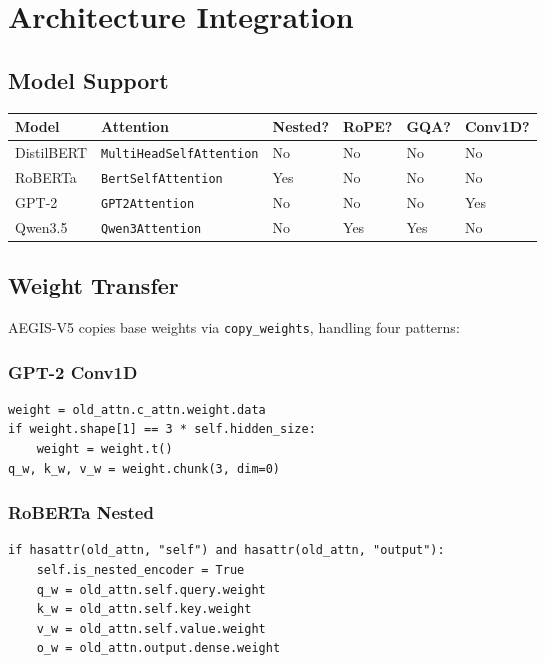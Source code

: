 \section{Architecture Integration}

\subsection{Model Support}

\begin{table}[H]
\centering
\small
\begin{tabular}{llllll}
\toprule
\textbf{Model} & \textbf{Attention} & \textbf{Nested?} & \textbf{RoPE?} & \textbf{GQA?} & \textbf{Conv1D?} \\
\midrule
DistilBERT & \texttt{MultiHeadSelfAttention} & No & No & No & No \\
RoBERTa & \texttt{BertSelfAttention} & Yes & No & No & No \\
GPT-2 & \texttt{GPT2Attention} & No & No & No & Yes \\
Qwen3.5 & \texttt{Qwen3Attention} & No & Yes & Yes & No \\
\bottomrule
\end{tabular}
\end{table}

\subsection{Weight Transfer}

AEGIS-V5 copies base weights via \texttt{copy\_weights}, handling four patterns:

\subsubsection{GPT-2 Conv1D}

\begin{lstlisting}
weight = old_attn.c_attn.weight.data
if weight.shape[1] == 3 * self.hidden_size:
    weight = weight.t()
q_w, k_w, v_w = weight.chunk(3, dim=0)
\end{lstlisting}

\subsubsection{RoBERTa Nested}

\begin{lstlisting}
if hasattr(old_attn, "self") and hasattr(old_attn, "output"):
    self.is_nested_encoder = True
    q_w = old_attn.self.query.weight
    k_w = old_attn.self.key.weight
    v_w = old_attn.self.value.weight
    o_w = old_attn.output.dense.weight
\end{lstlisting}

